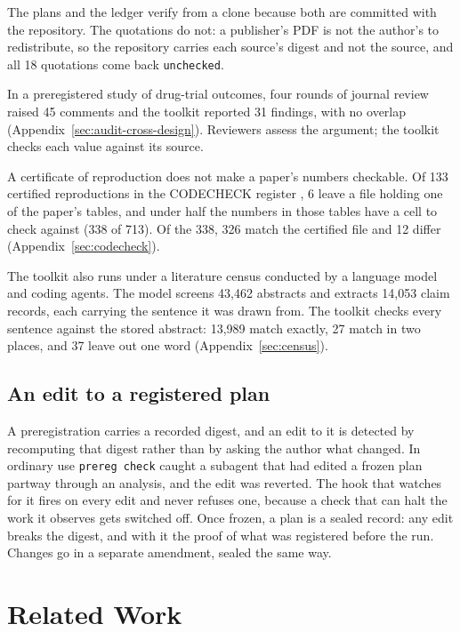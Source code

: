 \documentclass{article}
\newcommand{\code}[1]{\texttt{#1}}
\begin{document}
The plans and the ledger verify from a clone because both are committed with the repository. The
quotations do not: a publisher's PDF is not the author's to redistribute, so the repository
carries each source's digest and not the source, and all 18 quotations come back
\code{unchecked}.

In a preregistered study of drug-trial outcomes, four rounds of journal review raised 45 comments
and the toolkit reported 31 findings, with no overlap (Appendix~\ref{sec:audit-cross-design}). Reviewers
assess the argument; the toolkit checks each value against its source.

A certificate of reproduction does not make a paper's numbers checkable. Of 133 certified
reproductions in the CODECHECK register \citep{nust2021codecheck}, 6 leave a file holding one of
the paper's tables, and under half the numbers in those tables have a cell to check against
(338 of 713). Of the 338, 326 match the certified file and 12 differ
(Appendix~\ref{sec:codecheck}).

The toolkit also runs under a literature census conducted by a language model and coding agents.
The model screens 43{,}462 abstracts and extracts 14{,}053 claim records, each carrying the
sentence it was drawn from. The toolkit checks every sentence against the stored abstract:
13{,}989 match exactly, 27 match in two places, and 37 leave out one word
(Appendix~\ref{sec:census}).

\subsection{An edit to a registered plan}

A preregistration carries a recorded digest, and an edit to it is detected by recomputing that
digest rather than by asking the author what changed. In ordinary use \code{prereg check} caught
a subagent that had edited a frozen plan partway through an analysis, and the edit was reverted.
The hook that watches for it fires on every
edit and never refuses one, because a check that can halt the work it observes gets switched off.
Once frozen, a plan is a sealed record: any edit breaks the digest, and with it the proof of what
was registered before the run. Changes go in a separate amendment, sealed the same way.

\section{Related Work}
\label{sec:related}
\end{document}

